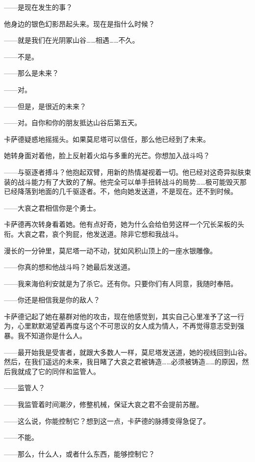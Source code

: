 \documentclass[AutoFakeBold=true]{book}
\begin{document}
{\kaishu ——是现在发生的事？}

他身边的银色幻影昂起头来。{\kaishu 现在是指什么时候？}

{\kaishu ——就是我们在光阴冢山谷……相遇……不久。}

{\kaishu ——不是。}

{\kaishu ——那么是未来？}

{\kaishu ——对。}

{\kaishu ——但是，是很近的未来？}

{\kaishu ——对。自你和你的朋友抵达山谷后第五天。}

卡萨德疑惑地摇摇头。如果莫尼塔可以信任，那么他已经到了未来。

她转身面对着他，脸上反射着火焰与多重的光芒。{\kaishu 你想加入战斗吗？}

{\kaishu ——与驱逐者搏斗？}他抱起双臂，用新的热情凝视着一切。他已经对这奇异拟肤束装的战斗能力有了大致的了解。他完全可以单手扭转战斗的局势……极可能毁灭那已经降落到地面的几千驱逐者。{\kaishu 不，}他向她发送道，{\kaishu 不是现在。还不到时候。}

{\kaishu ——大哀之君相信你是个勇士。}

卡萨德再次转身看着她。他有点好奇，她为什么会给伯劳这样一个冗长呆板的头衔。{\kaishu 大哀之君，哀个狗屁，}他发送道。{\kaishu 除非它想和我战斗。}

漫长的一分钟里，莫尼塔一动不动，犹如风积山顶上的一座水银雕像。

{\kaishu ——你真的想和他战斗吗？}她最后发送道。

{\kaishu ——我来海伯利安就是为了杀它。还有你。只要你们有人同意，我随时奉陪。}

{\kaishu ——你还是相信我是你的敌人？}

卡萨德记起了她在墓群对他的攻击，现在他感觉到，其实自己心里准予了这一行为，心里默默渴望着再度与这个不可思议的女人成为情人，不再觉得意志受到强暴。{\kaishu 我不知道你是什么人。}

{\kaishu ——最开始我是受害者，就跟大多数人一样，}莫尼塔发送道，她的视线回到山谷。{\kaishu 然后，在我们遥远的未来，我目睹了大哀之君被铸造……必须被铸造……的原因，然后我就成了它的同伴和监管人。}

{\kaishu ——监管人？}

{\kaishu ——我监管着时间潮汐，修整机械，保证大哀之君不会提前苏醒。}

{\kaishu ——这么说，你能控制它？想到这一点，卡萨德的脉搏变得急促了。}

{\kaishu ——不能。}

{\kaishu ——那么，什么人，或者什么东西，能够控制它？}
\end{document}
